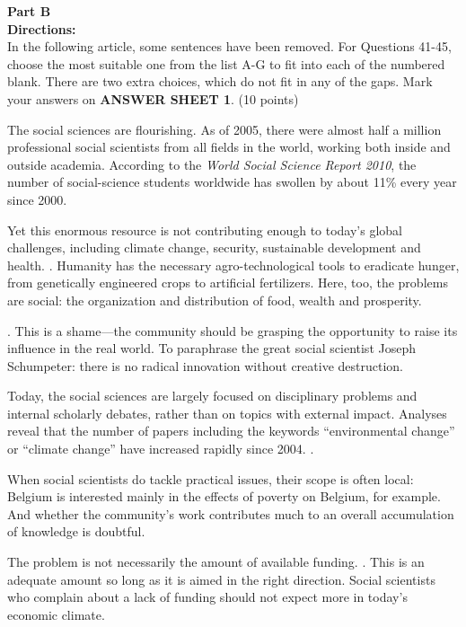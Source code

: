 \noindent
\textbf{Part B}\\
\textbf{Directions:}\\
In the following article, some sentences have been removed. For
	Questions 41-45, choose the most suitable one from the list A-G to fit
	into each of the numbered blank. There are two extra choices, which do
	not fit in any of the gaps. Mark your answers on \textbf{ANSWER SHEET 1}. (10 points)


\TiGanSpace


The social sciences are flourishing. As of 2005, there were almost half
a million professional social scientists from all fields in the world,
working both inside and outside academia. According to the \emph{World
	Social Science Report 2010}, the number of social-science students
worldwide has swollen by about 11\% every year since 2000.

Yet this enormous resource is not contributing enough to today's global
challenges, including climate change, security, sustainable development
and health.  
\linefill.
Humanity has
the necessary agro-technological tools to eradicate hunger, from
genetically engineered crops to artificial fertilizers. Here, too, the
problems are social: the organization and distribution of food, wealth
and prosperity.




\linefill. This is a shame---the
community should be grasping the opportunity to raise its influence in
the real world. To paraphrase the great social scientist Joseph
Schumpeter: there is no radical innovation without creative destruction.

Today, the social sciences are largely focused on disciplinary problems
and internal scholarly debates, rather than on topics with external
impact. Analyses reveal that the number of papers including the keywords
``environmental change'' or ``climate change'' have increased rapidly
since 2004. \linefill.

When social scientists do tackle practical issues, their scope is often
local: Belgium is interested mainly in the effects of poverty on
Belgium, for example. And whether the community's work contributes much
to an overall accumulation of knowledge is doubtful.

The problem is not necessarily the amount of available funding. \linefill. This is an adequate amount so
long as it is aimed in the right direction. Social scientists who
complain about a lack of funding should not expect more in today's
economic climate.

